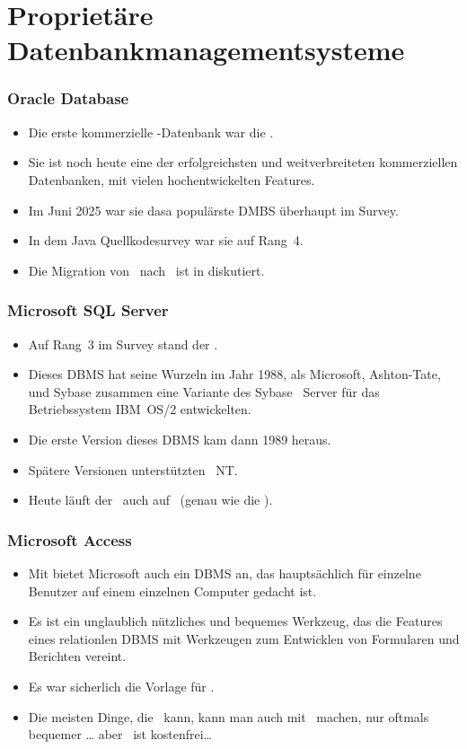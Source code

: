 \documentclass[aspectratio=169,mathserif,notheorems]{beamer}%
\begin{document}
\section{Proprietäre Datenbankmanagementsysteme}%
%
\begin{frame}%
\frametitle{Oracle Database}%
\begin{itemize}%
\item Die erste kommerzielle \sql-Datenbank war die \oracleDB\cite{C20245YOQ,O2007OTHTMIMIOHWCFTPWMIH}.%
\item<2-> Sie ist noch heute eine der erfolgreichsten und weitverbreiteten kommerziellen Datenbanken, mit vielen hochentwickelten Features\cite{BBDDSY2011ADOODM,KK2021EODATASFHPAP}.%
\item<3-> Im Juni 2025 war sie dasa populärste DMBS überhaupt im Survey\cite{RS2025DERORD}.
\item<4-> In dem Java Quellkodesurvey\cite{PMPVEPWGSMB2025ATAODMSTTHOOSP} war sie auf Rang~4.%
\item<5-> Die Migration von \oracleDB\ nach \postgresql\ ist in\cite{KO2023DMFOTP} diskutiert.%
\end{itemize}%
\end{frame}%
%
\begin{frame}%
\frametitle{Microsoft SQL Server}%
\begin{itemize}%
\item Auf Rang~3 im Survey\cite{RS2025DERORD} stand der \microsoftSqlServer\cite{P2020MSS2ABG,A2024TSAFMSS2,W2018MSSDB}.%
\item<2-> Dieses DBMS hat seine Wurzeln im Jahr 1988, als Microsoft, Ashton-Tate, und Sybase zusammen eine Variante des Sybase \sql\ Server für das Betriebssystem IBM~OS/2 entwickelten\cite{W2018MSSDB:TEOMSS}.%
\item<3-> Die erste Version dieses DBMS kam dann 1989 heraus.%
\item<4-> Spätere Versionen unterstützten \microsoftWindows~NT.%
\item<5-> Heute läuft der \microsoftSqlServer\ auch auf \linux~(genau wie die \oracleDB).%
\end{itemize}%
\end{frame}%
%
\begin{frame}%
\frametitle{Microsoft Access}%
\begin{itemize}%
\item Mit \microsoftAccess\cite{LF2022MOSBSO2AM3} bietet Microsoft auch ein DBMS an, das hauptsächlich für einzelne Benutzer auf einem einzelnen Computer gedacht ist.%
\item<2-> Es ist ein unglaublich nützliches und bequemes Werkzeug, das die Features eines relationlen DBMS mit Werkzeugen zum Entwicklen von Formularen und Berichten vereint\cite{SSI2023MA2BTA,B2020HOMA2,UC2021AFD,MM2014RDAMA}.%
\item<3-> Es war sicherlich die Vorlage für \libreofficeBase.%
\item<4-> Die meisten Dinge, die \libreofficeBase\ kann, kann man auch mit \microsoftAccess\ machen, nur oftmals bequemer {\dots} aber \libreofficeBase\ ist kostenfrei\dots%
\end{itemize}%
\end{frame}%
\end{document}
